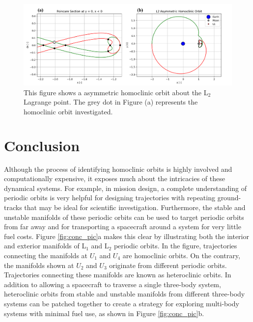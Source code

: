 \documentclass[11pt]{article} %
\begin{document}
\begin{figure}[H]
    \centering
    \includegraphics[width=\textwidth]{asym_homo_comb.png}
    \caption{This figure shows a asymmetric homoclinic orbit about the L$_2$ Lagrange point. The grey dot in Figure (a) represents the homoclinic orbit investigated.}
    \label{f:asym_homo}
\end{figure}


\section{Conclusion}

Although the process of identifying homoclinic orbits is highly involved and computationally expensive, it exposes much about the intricacies of these dynamical systems. For example, in mission design, a complete understanding of periodic orbits is very helpful for designing trajectories with repeating ground-tracks that may be ideal for scientific investigation. Furthermore, the stable and unstable manifolds of these periodic orbits can be used to target periodic orbits from far away and for transporting a spacecraft around a system for very little fuel costs. Figure \ref{fig:conc_pic}a makes this clear by illustrating both the interior and exterior manifolds of L$_1$ and L$_2$ periodic orbits. In the figure, trajectories connecting the manifolds at $U_1$ and $U_4$ are homoclinic orbits. On the contrary, the manifolds shown at $U_2$ and $U_3$ originate from different periodic orbits. Trajectories connecting these manifolds are known as heteroclinic orbits. In addition to allowing a spacecraft to traverse a single three-body system, heteroclinic orbits from stable and unstable manifolds from different three-body systems can be patched together to create a strategy for exploring multi-body systems with minimal fuel use, as shown in Figure \ref{fig:conc_pic}b.
\end{document}
